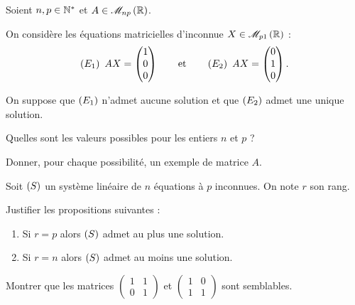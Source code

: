 \begin{corr}
\end{corr}

\begin{exo}
Soient \(n,p\in\mathbb{N}^*\) et \(A\in\M{np}[\R]\).

On considère les équations matricielles d'inconnue \(X\in\M{p1}[\R]\) : \[\left(E_1\right)~AX=\begin{pmatrix}1\\0\\0\end{pmatrix}\qquad\text{et}\qquad\left(E_2\right)~AX=\begin{pmatrix}0\\1\\0\end{pmatrix}.\]

On suppose que \(\left(E_1\right)\) n'admet aucune solution et que \(\left(E_2\right)\) admet une unique solution.

Quelles sont les valeurs possibles pour les entiers \(n\) et \(p\) ?

Donner, pour chaque possibilité, un exemple de matrice \(A\).
\end{exo}

\begin{corr}
\end{corr}

\begin{exo}
Soit \(\left(S\right)\) un système linéaire de \(n\) équations à \(p\) inconnues. On note \(r\) son rang.

Justifier les propositions suivantes :

\begin{enumerate}
\item Si \(r=p\) alors \(\left(S\right)\) admet au plus une solution. \\

\item Si \(r=n\) alors \(\left(S\right)\) admet au moins une solution.
\end{enumerate}
\end{exo}

\begin{corr}
\end{corr}

\begin{exo}
Montrer que les matrices \(\begin{pmatrix}
1 & 1 \\
0 & 1
\end{pmatrix}\) et \(\begin{pmatrix}
1 & 0 \\
1 & 1
\end{pmatrix}\) sont semblables.
\end{exo}

